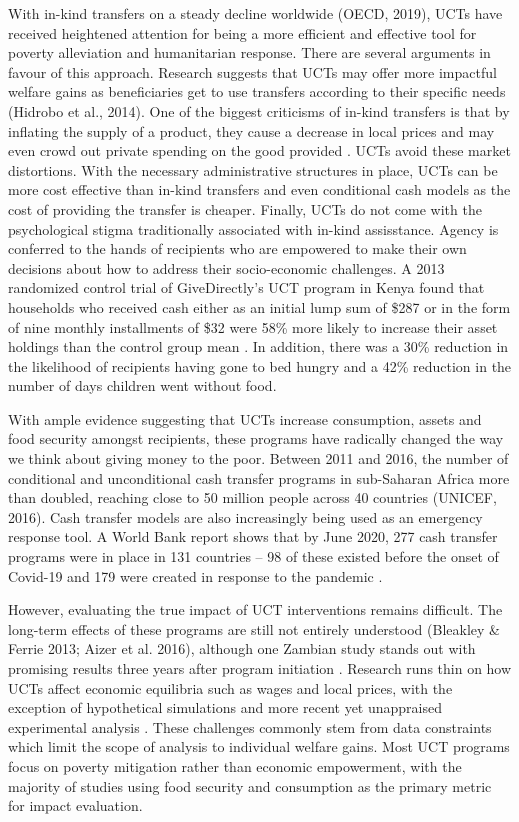 \documentclass[12pt]{article}
\begin{document}
With in-kind transfers on a steady decline worldwide (OECD, 2019), UCTs have received heightened attention for being a more efficient and effective tool for poverty alleviation and humanitarian response. There are several arguments in favour of this approach. Research suggests that UCTs may offer more impactful welfare gains as beneficiaries get to use transfers according to their specific needs (Hidrobo et al., 2014). One of the biggest criticisms of in-kind transfers is that by inflating the supply of a product, they cause a decrease in local prices and may even crowd out private spending on the good provided \citep{cunha2019price}. UCTs avoid these market distortions. With the necessary administrative structures in place, UCTs can be more cost effective than in-kind transfers and even conditional cash models as the cost of providing the transfer is cheaper. Finally, UCTs do not come with the psychological stigma traditionally associated with in-kind assisstance. Agency is conferred to the hands of recipients who are empowered to make their own decisions about how to address their socio-economic challenges. A 2013 randomized control trial of GiveDirectly’s UCT program in Kenya found that households who received cash either as an initial lump sum of \$287 or in the form of nine monthly installments of \$32 were 58\% more likely to increase their asset holdings than the control group mean \citep{haushofer2013policy}. In addition, there was a 30\% reduction in the likelihood of recipients having gone to bed hungry and a 42\% reduction in the number of days children went without food.

With ample evidence suggesting that UCTs increase consumption, assets and food security amongst recipients, these programs have radically changed the way we think about giving money to the poor. Between 2011 and 2016, the number of conditional and unconditional cash transfer programs in sub-Saharan Africa more than doubled, reaching close to 50 million people across 40 countries (UNICEF, 2016). Cash transfer models are also increasingly being used as an emergency response tool. A World Bank report shows that by June 2020, 277 cash transfer programs were in place in 131 countries – 98 of these existed before the onset of Covid-19 and 179 were created in response to the pandemic \citep{gentilini2020social}.

However, evaluating the true impact of UCT interventions remains difficult. The long-term effects of these programs are still not entirely understood (Bleakley \& Ferrie 2013; Aizer et al. 2016), although one Zambian study stands out with promising results three years after program initiation \citep{handa2018can}. Research runs thin on how UCTs affect economic equilibria such as wages and local prices, with the exception of hypothetical simulations \citep{thome2016local} and more recent yet unappraised experimental analysis \citep{egger2019general}. These challenges commonly stem from data constraints which limit the scope of analysis to individual welfare gains. Most UCT programs focus on poverty mitigation rather than economic empowerment, with the majority of studies using food security and consumption as the primary metric for impact evaluation.
\end{document}

